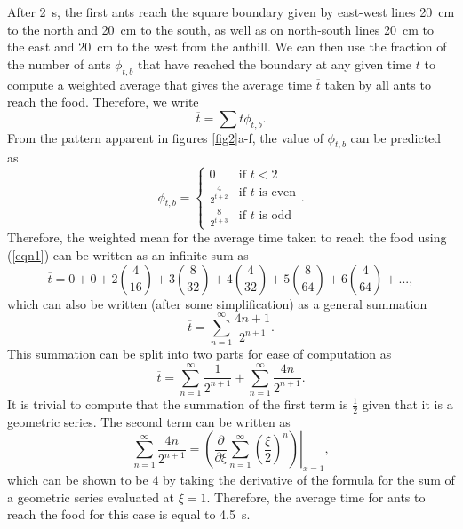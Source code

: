 \documentclass[11pt, a4paper]{article}
\begin{document}
After \SI{2}{s}, the first ants reach the square boundary given by east-west lines \SI{20}{cm} to the north and \SI{20}{cm} to the south, as well as on north-south lines \SI{20}{cm} to the east and \SI{20}{cm} to the west from the anthill. We can then use the fraction of the number of ants $\phi_{t,b}$ that have reached the boundary at any given time $t$ to compute a weighted average that gives the average time $\overline{t}$ taken by all ants to reach the food. Therefore, we write 
\begin{equation}
    \overline{t} = \sum{t\phi_{t,b}}.
    \label{eqn1}
\end{equation}
From the pattern apparent in figures \ref{fig2}a-f, the value of $\phi_{t,b}$ can be predicted as
\begin{equation}
    \phi_{t,b} = 
    \begin{cases}
        0 & \text{if } t < 2\\
        \frac{4}{2^{t+2}} & \text{if } t \text{ is even}\\
        \frac{8}{2^{t+3}} & \text{if } t \text{ is odd}
    \end{cases}.
\end{equation}
Therefore, the weighted mean for the average time taken to reach the food using (\ref{eqn1}) can be written as an infinite sum as
\begin{equation}
    \overline{t} = 0 + 0 + 2(\frac{4}{16}) + 3(\frac{8}{32}) + 4(\frac{4}{32}) + 5(\frac{8}{64}) + 6(\frac{4}{64}) + ...,
\end{equation} 
which can also be written (after some simplification) as a general summation 
\begin{equation}
    \overline{t} = \sum_{n=1}^{\infty} \frac{4n+1}{2^{n+1}}.
\end{equation} 
This summation can be split into two parts for ease of computation as 
\begin{equation}
    \overline{t} = \sum_{n=1}^{\infty} \frac{1}{2^{n+1}} + \sum_{n=1}^{\infty} \frac{4n}{2^{n+1}}.
\end{equation} 
It is trivial to compute that the summation of the first term is $\frac{1}{2}$ given that it is a geometric series. The second term can be written as 
\begin{equation}
    \sum_{n=1}^{\infty} \frac{4n}{2^{n+1}} = \left.\left(\frac{\partial}{\partial \xi}\sum_{n=1}^{\infty} \left(\frac{\xi}{2}\right)^n\right)\right|_{x=1},
\end{equation}
which can be shown to be $4$ by taking the derivative of the formula for the sum of a geometric series evaluated at $\xi=1$. Therefore, the average time for ants to reach the food for this case is equal to \SI{4.5}{s}.
\end{document}
